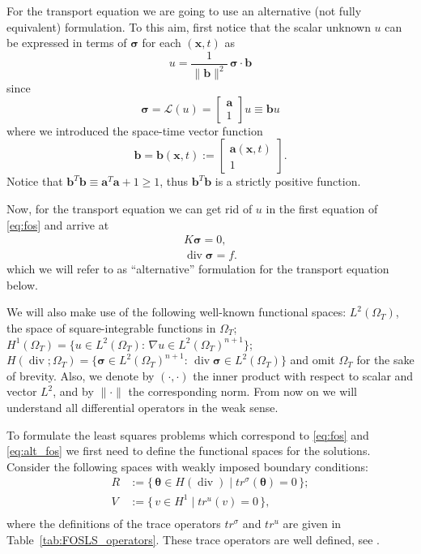 \documentclass[a4paper,12pt]{amsart}
\numberwithin{equation}{section}
\renewcommand{\div}{\operatorname{div}}
\def\bu{{\mathbf a}} %
\def\bb{{\mathbf b}}
\renewcommand{\L}{{\mathcal L}}
\def\XVec#1{{\mathbf #1}}
\def\Xx{\XVec{x}}
\def\btheta{{\boldsymbol \theta}}
\def\bsigma{{\boldsymbol \sigma}}
\begin{document}
For the transport equation we are going to use an alternative (not fully equivalent) formulation. To this aim, first notice that the scalar unknown $u$ can be expressed in terms of $\bsigma$ for each $(\Xx,t)$ as
\begin{equation}
\label{eq:S}
u = \frac{1}{\| \bb \|^2 } \, \bsigma \cdot \bb
\end{equation}
since
$$
\bsigma = \L(u) = \left[ \begin{array}{c} \bu \\ 1 \end{array} \right] u \equiv \bb u
$$
where we introduced the space-time vector function
\[
\bb = \bb(\Xx,t) := \begin{bmatrix} \bu(\Xx,t) \\ 1 \end{bmatrix}.
\]
Notice that $\bb^T\bb \equiv \bu^T\bu+1 \ge 1$, thus $\bb^T\bb$ is a strictly positive function.

Now, for the transport equation we can get rid of $u$ in the first equation of \eqref{eq:fos} and arrive at
\begin{equation}
\begin{array}{c}
K \bsigma = 0,  \\ 
\div \bsigma = f. 
\end{array}
\label{eq:alt_fos} 
\end{equation}
which we will refer to as ``alternative'' formulation for the transport equation below.

We will also make use of the following well-known functional spaces: $L^2(\Omega_T)$, the space of square-integrable functions in $\Omega_T$; $H^1(\Omega_T) = \{ u \in L^2(\Omega_T) : \, \nabla u \in L^2(\Omega_T)^{n+1} \} $; $H(\div; \Omega_T) = \{ \bsigma \in L^2(\Omega_T)^{n+1} : \, \div \bsigma \in L^2(\Omega_T) \}$ and omit $\Omega_T$ for the sake of brevity. Also, we denote by  $(\cdot,\cdot)$ the inner product with respect to scalar and vector $L^2$, and by $\|\cdot \|$ the corresponding norm. From now on we will understand all differential operators in the weak sense. %

To formulate the least squares problems which correspond to \eqref{eq:fos} and \eqref{eq:alt_fos} we first need to define the functional spaces for the solutions.
Consider the following spaces with weakly imposed boundary conditions:
\begin{equation}
\begin{split}
R & := \{\,\btheta \in H(\div) \;|\; tr^\sigma(\btheta) = 0\,\};\\
V & := \{\,v \in H^1 \;|\; tr^u(v) = 0\,\},\\
\end{split}
\label{eq:spaces}
\end{equation}
where the definitions of the trace operators $tr^{\sigma}$ and $tr^u$ are given in Table~\ref{tab:FOSLS_operators}. These trace operators are well defined, see \cite{gatica}. 
\end{document}
